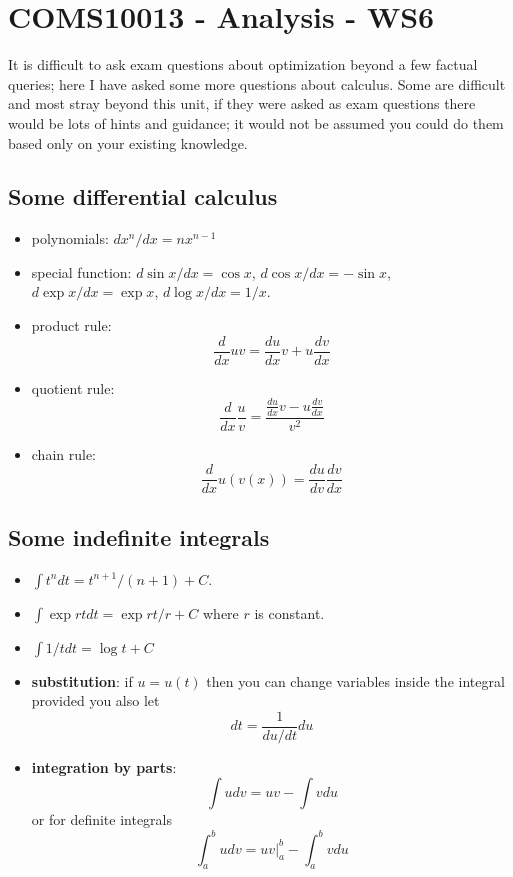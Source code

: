 \documentclass[11pt,a4paper]{scrartcl}
\begin{document}
\section*{COMS10013 - Analysis - WS6}

It is difficult to ask exam questions about optimization beyond a few
factual queries; here I have asked some more questions about
calculus. Some are difficult and most stray beyond this unit, if they
were asked as exam questions there would be lots of hints and
guidance; it would not be assumed you could do them based only on your
existing knowledge.

\subsection*{Some differential calculus}
\begin{itemize}
\item polynomials: $dx^n/dx=nx^{n-1}$
\item special function: $d\sin{x}/dx=\cos{x}$, $d\cos{x}/dx=-\sin{x}$, $d\exp{x}/dx=\exp{x}$, $d\log{x}/dx=1/x$.
\item product rule:
$$\frac{d}{dx}uv = \frac{du}{dx}v+u\frac{dv}{dx}$$
\item quotient rule:
$$\frac{d}{dx}\frac{u}{v}=\frac{\frac{du}{dx}v-u\frac{dv}{dx}}{v^2}$$
\item chain rule:
$$\frac{d}{dx}u(v(x))=\frac{du}{dv}\frac{dv}{dx}$$
\end{itemize}
  
\subsection*{Some indefinite integrals}
\begin{itemize}
\item $\int t^ndt =t^{n+1}/(n+1)+C$.
\item $\int \exp{rt}dt = \exp{rt}/r +C$ where $r$ is constant.
\item $\int 1/t{} dt = \log{t}+C$
\item \textbf{substitution}: if $u=u(t)$ then you can change variables inside the integral provided you also let
  \begin{equation}
    dt=\frac{1}{du/dt}du
  \end{equation}
\item \textbf{integration by parts}:
  \begin{equation}
    \int udv =uv-\int vdu
  \end{equation}
  or for definite integrals
  \begin{equation}
    \int_a^b udv =\left.uv\right|_a^b-\int_a^b vdu
  \end{equation}
  
\end{itemize}
\end{document}

